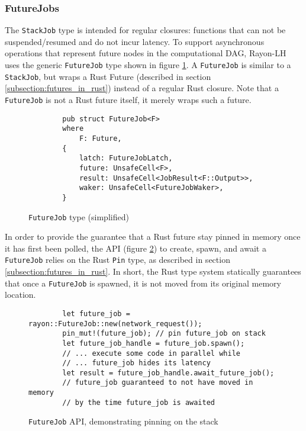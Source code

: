 \documentclass[bsc,frontabs,singlespacing,parskip,deptreport,normalheadings]{infthesis}
\begin{document}
\subsubsection*{FutureJobs}

The \texttt{StackJob} type is intended for regular closures: functions that can
not be suspended/resumed and do not incur latency. To support asynchronous
operations that represent future nodes in the computational DAG, Rayon-LH uses
the generic \texttt{FutureJob} type shown in figure \ref{fig:futurejob}. A
\texttt{FutureJob} is similar to a \texttt{StackJob}, but wraps a Rust Future
(described in section \ref{subsection:futures_in_rust}) instead of a regular
Rust closure. Note that a \texttt{FutureJob} is not a Rust future itself, it
merely wraps such a future.

\begin{figure}[ht]
    \begin{verbatim}
        pub struct FutureJob<F>
        where
            F: Future,
        {
            latch: FutureJobLatch,
            future: UnsafeCell<F>,
            result: UnsafeCell<JobResult<F::Output>>,
            waker: UnsafeCell<FutureJobWaker>,
        }
    \end{verbatim}
    \caption{\texttt{FutureJob} type (simplified)}
    \label{fig:futurejob}
\end{figure}

In order to provide the guarantee that a Rust future stay pinned in memory once
it has first been polled, the API (figure \ref{fig:future_job_api}) to create,
spawn, and await a \texttt{FutureJob} relies on the Rust \texttt{Pin} type, as
described in section \ref{subsection:futures_in_rust}. In short, the Rust type
system statically guarantees that once a \texttt{FutureJob} is spawned, it is
not moved from its original memory location.

\begin{figure}[ht]
    \begin{verbatim}
        let future_job = rayon::FutureJob::new(network_request());
        pin_mut!(future_job); // pin future_job on stack
        let future_job_handle = future_job.spawn();
        // ... execute some code in parallel while
        // ... future_job hides its latency
        let result = future_job_handle.await_future_job(); 
        // future_job guaranteed to not have moved in memory
        // by the time future_job is awaited
    \end{verbatim}
    \caption{\texttt{FutureJob} API, demonstrating pinning on the stack}
    \label{fig:future_job_api}
\end{figure}
\end{document}
